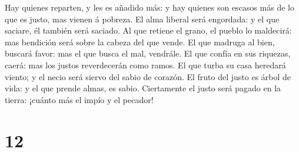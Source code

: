  Hay quienes reparten, y les es añadido más: y hay
quienes son escasos más de lo que es justo, mas vienen á pobreza.
 El alma liberal será engordada: y el que saciare, él
también será saciado.  Al que retiene el grano, el pueblo
lo maldecirá: mas bendición será sobre la cabeza del que vende.
 El que madruga al bien, buscará favor: mas el que busca
el mal, vendrále.  El que confía en sus riquezas, caerá:
mas los justos reverdecerán como ramos.  El que turba su
casa heredará viento; y el necio será siervo del sabio de corazón.
 El fruto del justo es árbol de vida: y el que prende
almas, es sabio.  Ciertamente el justo será pagado en la
tierra: ¡cuánto más el impío y el pecador!

\hypertarget{section-20-12}{%
\section{12}\label{section-20-12}}

